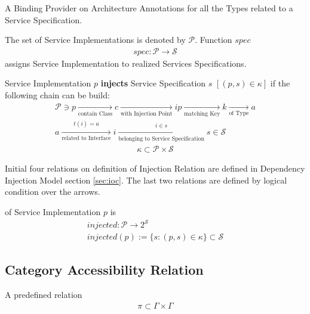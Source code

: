 \begin{defi}
  A Binding Provider on Architecture Annotations for all the Types related to a Service Specification.
\end{defi}

The set of Service Implementations is denoted by $\mathcal{P}$. Function $spec$
\begin{eqnarray}
 spec: \mathcal{P}  \rightarrow \mathcal{S}
\end{eqnarray}
assigns Service Implementation to realized Services Specifications.


\begin{defi}
  Service Implementation $p$ \textbf{injects} Service Specification $s$ $[(p,s)\in\kappa]$ if the following chain can be build:
\begin{eqnarray}
\mathcal{P} \ni p \xrightarrow[\text{contain Class}]{} c 
\xrightarrow[\text{with Injection Point}]{} ip
\xrightarrow[\text{matching Key}]{} k  
\xrightarrow[\text{of Type}]{} a \nonumber \\ 
a \xrightarrow[\text{related to Interface}]{t(i) = a} i
\xrightarrow[\text{belonging to Service Specification}]{i\in s} s \in \mathcal{S} \nonumber
\end{eqnarray}
\begin{eqnarray}
 \kappa \subset \mathcal{P} \times \mathcal{S}
\end{eqnarray}
\end{defi}

Initial four relations on definition of Injection Relation are defined in Dependency Injection Model section \ref{sec:ioc}. The last two relations are defined by logical condition over the arrows.

\begin{defi}
  of Service Implementation $p$ is 
\begin{eqnarray}
&injected : \mathcal{P} \rightarrow 2^\mathcal{S}& \\
&injected(p) := \{ s : (p,s)\in \kappa \} \subset \mathcal{S} &\nonumber
\end{eqnarray}
\end{defi}

\subsection{Category Accessibility Relation}

\begin{defi}
  A predefined relation
\begin{eqnarray}
\pi \subset \Gamma \times \Gamma
\end{eqnarray}
\end{defi}

